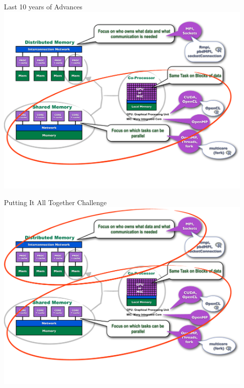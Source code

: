 \begin{frame}
  \begin{block}{Last 10 years of Advances}
    \includegraphics[width=0.95\textwidth]{../common/pics/ParallelHardware9.pdf}
  \end{block}
\end{frame}

\begin{frame}
  \begin{block}{Putting It All Together Challenge}
    \includegraphics[width=0.95\textwidth]{../common/pics/ParallelHardware10.pdf}
  \end{block}
\end{frame}

